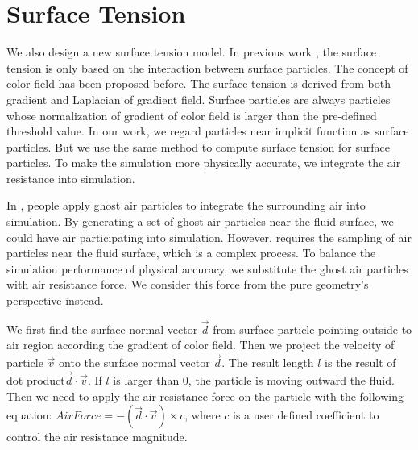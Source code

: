 

\section{Surface Tension}

We also design a new surface tension model. In previous work
\cite{Muller:2003:PFS:846276.846298}, the surface tension is only
based on the interaction between surface particles. The concept of
color field\cite{Muller:2003:PFS:846276.846298} has been proposed
before. The surface tension is derived from both gradient and
Laplacian of gradient field. Surface particles are always particles
whose normalization of gradient of color field is larger than the
pre-defined threshold value. In our work, we regard particles near
implicit function as surface particles. But we use the same method to
compute surface tension for surface particles. To make the simulation
more physically accurate, we integrate the air resistance into
simulation.

In \cite{Schechter:2012:GSA:2185520.2185557}, people apply ghost air
particles to integrate the surrounding air into simulation. By
generating a set of ghost air particles near the fluid surface, we
could have air participating into simulation. However,
\cite{Schechter:2012:GSA:2185520.2185557} requires the sampling of air
particles near the fluid surface, which is a complex process. To
balance the simulation performance of physical accuracy, we substitute
the ghost air particles with air resistance force. We consider this
force from the pure geometry's perspective instead.

We first find the surface normal vector $\vec{d}$ from surface
particle pointing outside to air region according the gradient of
color field. Then we project the velocity of particle $\vec{v}$ onto
the surface normal vector $\vec{d}$. The result length $l$ is the
result of dot product$\vec{d} \cdot \vec{v}$. If $l$ is larger than
$0$, the particle is moving outward the fluid. Then we need to apply
the air resistance force on the particle with the following equation:
$AirForce=-(\vec{d} \cdot \vec{v})\times c$, where $c$ is a user
defined coefficient to control the air resistance magnitude.

